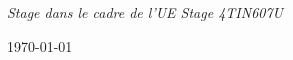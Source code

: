 \documentclass[
11pt, %
fr, %
singlespacing, %
headsepline, %
]{MastersDoctoralThesis} %
\begin{document}
\begin{titlepage}
\begin{center}
\vfill

  \large \textit{Stage dans le cadre de l'UE Stage 4TIN607U}\\[0.3cm]

\vfill

{\large \today}\\[4cm] %

{
  \hspace{2cm}
}

\vfill
\end{center}
\end{titlepage}


%
%
%
%
\end{document}
